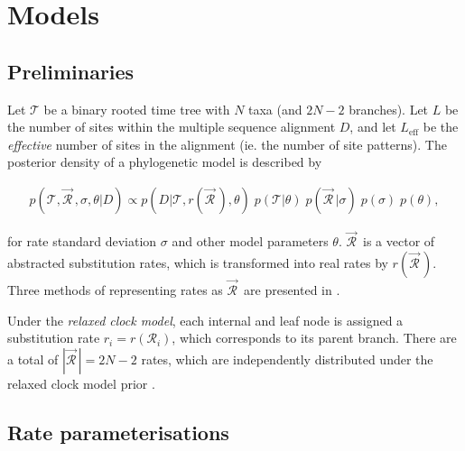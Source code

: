 \documentclass[10pt,letterpaper]{article}
\begin{document}
\section*{Models} \label{sect:models}



\subsection*{Preliminaries}




Let $\mathcal{T}$ be a binary rooted time tree with $N$ taxa (and $2N-2$ branches). Let $L$ be the number of sites within the multiple sequence alignment $D$, and let $L_\text{eff}$ be the \textit{effective} number of sites in the alignment (ie. the number of site patterns). The posterior density of a phylogenetic model is described by

\begin{eqnarray}
\label{eq:bayesian}
p(\mathcal{T}, \vec{\mathcal{R}}^{\,}, \sigma, \theta|D) \propto  p(D|\mathcal{T}, r(\vec{\mathcal{R}}^{\,}), \theta) \; p(\mathcal{T}|\theta) \;  p(\vec{\mathcal{R}}^{\,} | \sigma) \; p(\sigma) \; p(\theta),
\end{eqnarray}

for rate standard deviation $\sigma$ and other model parameters $\theta$. $\vec{\mathcal{R}}^{\,}$ is a vector of abstracted substitution rates, which is transformed into real rates by $r(\vec{\mathcal{R}}^{\,})$. Three methods of representing rates as $\vec{\mathcal{R}}^{\,}$ are presented in \textbf{}.  




Under the \textit{relaxed clock model}, each internal and leaf node is assigned a substitution rate $r_i = r(\mathcal{R}_i)$, which corresponds to its parent branch. There are a total of $|\vec{\mathcal{R}}^{\,}| = 2N-2$ rates, which are independently distributed under the relaxed clock model prior  \cite{drummond2006relaxed}. 




 





\subsection*{Rate parameterisations}
\label{sect:rateparams}
\end{document}
